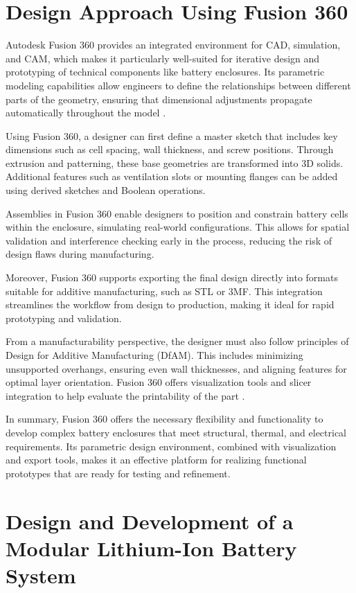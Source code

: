\section{Design Approach Using Fusion 360}
Autodesk Fusion 360 provides an integrated environment for CAD, simulation, and CAM, which makes it particularly well-suited for iterative design and prototyping of technical components like battery enclosures. Its parametric modeling capabilities allow engineers to define the relationships between different parts of the geometry, ensuring that dimensional adjustments propagate automatically throughout the model \cite{hogan2025}.

Using Fusion 360, a designer can first define a master sketch that includes key dimensions such as cell spacing, wall thickness, and screw positions. Through extrusion and patterning, these base geometries are transformed into 3D solids. Additional features such as ventilation slots or mounting flanges can be added using derived sketches and Boolean operations.

Assemblies in Fusion 360 enable designers to position and constrain battery cells within the enclosure, simulating real-world configurations. This allows for spatial validation and interference checking early in the process, reducing the risk of design flaws during manufacturing.

Moreover, Fusion 360 supports exporting the final design directly into formats suitable for additive manufacturing, such as STL or 3MF. This integration streamlines the workflow from design to production, making it ideal for rapid prototyping and validation.

From a manufacturability perspective, the designer must also follow principles of Design for Additive Manufacturing (DfAM). This includes minimizing unsupported overhangs, ensuring even wall thicknesses, and aligning features for optimal layer orientation. Fusion 360 offers visualization tools and slicer integration to help evaluate the printability of the part \cite{anderson2020}.

In summary, Fusion 360 offers the necessary flexibility and functionality to develop complex battery enclosures that meet structural, thermal, and electrical requirements. Its parametric design environment, combined with visualization and export tools, makes it an effective platform for realizing functional prototypes that are ready for testing and refinement.

\section{Design and Development of a Modular Lithium-Ion Battery System}


